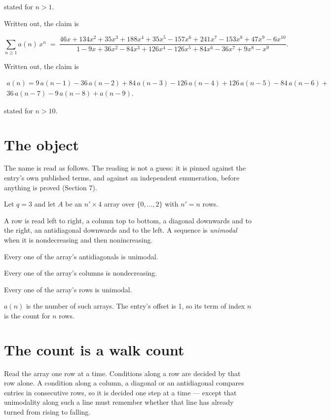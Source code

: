 \documentclass[11pt]{article}
\theoremstyle{definition}
\begin{document}
stated for $n > 1$.

Written out, the claim is

\[\sum_{n \ge 1} a(n)\,x^n \;=\; \frac{46x + 134x^{2} + 35x^{3} + 188x^{4} + 35x^{5} - 157x^{6} + 241x^{7} - 153x^{8} + 47x^{9} - 6x^{10}}{1 - 9x + 36x^{2} - 84x^{3} + 126x^{4} - 126x^{5} + 84x^{6} - 36x^{7} + 9x^{8} - x^{9}}.\]

Written out, the claim is

\begin{multline*} a(n) = 9\,a(n-1) - 36\,a(n-2) + 84\,a(n-3) - 126\,a(n-4) + 126\,a(n-5) - 84\,a(n-6) + \\ 36\,a(n-7) - 9\,a(n-8) + a(n-9). \end{multline*}

stated for $n > 10$.

\section{The object}

The name is read as follows. The reading is not a guess: it is pinned against the entry's own published terms, and against an independent enumeration, before anything is proved (Section 7).

Let $q = 3$ and let $A$ be an $n' \times 4$ array over $\{0,\dots,2\}$ with $n' = n$ rows.

A row is read left to right, a column top to bottom, a diagonal downwards and to the right, an antidiagonal downwards and to the left. A sequence is {\itshape unimodal} when it is nondecreasing and then nonincreasing.

Every one of the array's antidiagonals is unimodal.

Every one of the array's columns is nondecreasing.

Every one of the array's rows is unimodal.

$a(n)$ is the number of such arrays. The entry's offset is 1, so its term of index $n$ is the count for $n$ rows.

\section{The count is a walk count}

Read the array one row at a time. Conditions along a row are decided by that row alone. A condition along a column, a diagonal or an antidiagonal compares entries in consecutive rows, so it is decided one step at a time --- except that unimodality along such a line must remember whether that line has already turned from rising to falling.
\end{document}
